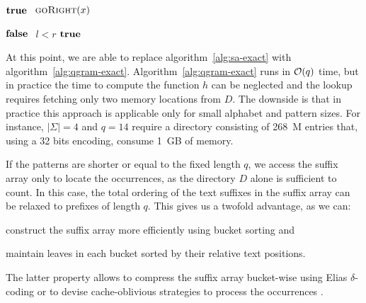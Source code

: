 \begin{algorithm}[h!]
\begin{minipage}[t]{.5\textwidth}
\label{alg:qgram-godown}
\begin{algorithmic}[1]
		\State \Return \False
	\EndIf
		\State \Return $\textbf{true }$
	\Else
		\State \Return $\Call{goRight}{$\Tn$}$		
	\EndIf
\EndProcedure
\end{algorithmic}
\end{minipage}
\begin{minipage}[t]{.5\textwidth}
\label{alg:qgram-goright}
\begin{algorithmic}[1]
		\State \Return \False
	\EndIf
	\Repeat
			\State \Return $\textbf{false }$
		\EndIf
	\Until $l < r$
	\State \Return $\textbf{true }$
\EndProcedure
\end{algorithmic}
\end{minipage}
\end{algorithm}

At this point, we are able to replace algorithm~\ref{alg:sa-exact} with algorithm~\ref{alg:qgram-exact}.
Algorithm~\ref{alg:qgram-exact} runs in $\mathcal{O}(q)$ time, but in practice the time to compute the function $h$ can be neglected and the lookup requires fetching only two memory locations from $D$.
The downside is that in practice this approach is applicable only for small alphabet and pattern sizes.
For instance, $|\Sigma| = 4$ and $q=14$ require a directory consisting of 268~M entries that, using a 32 bits encoding, consume 1~GB of memory.

If the patterns are shorter or equal to the fixed length $q$, we access the suffix array only to locate the occurrences, as the directory $D$ alone is sufficient to count.
In this case, the total ordering of the text suffixes in the suffix array can be relaxed to prefixes of length $q$.
This gives us a twofold advantage, as we can:
\begin{inparaenum}[(i)]
\item construct the suffix array more efficiently using bucket sorting and
\item maintain leaves in each bucket sorted by their relative text positions.
\end{inparaenum}
The latter property allows to compress the suffix array bucket-wise \eg using Elias $\delta$-coding \citep{?} or to devise cache-oblivious strategies to process the occurrences \citep{?}.

